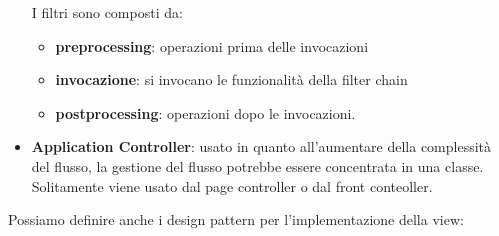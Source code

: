 \begin{itemize}
            I filtri sono composti da:
            \begin{itemize}
                  \item \textbf{preprocessing}: operazioni prima delle invocazioni
                  \item \textbf{invocazione}: si invocano le funzionalità della
                        filter chain
                  \item \textbf{postprocessing}: operazioni dopo le invocazioni.
            \end{itemize}
      \item \textbf{Application Controller}: usato in quanto all'aumentare della
            complessità del flusso, la gestione del flusso potrebbe essere concentrata in
            una classe. Solitamente viene usato dal page controller o dal front conteoller.
\end{itemize}
Possiamo definire anche i design pattern per l'implementazione della view:
